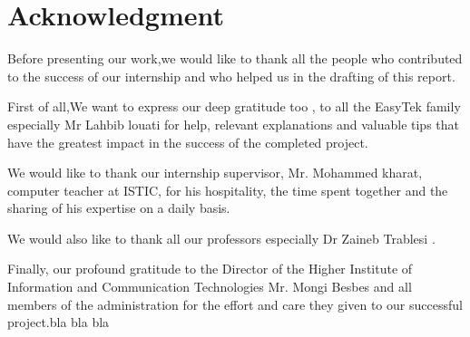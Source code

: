 

\chapter*{Acknowledgment}
Before presenting our work,we would like to thank all the people who contributed to the success of our internship and who helped us in the drafting of this report.

\vspace * {1cm}
First of all,We want to express our deep gratitude too ,  to all the EasyTek family especially Mr Lahbib louati for help, relevant explanations and valuable tips that have the greatest impact in the success of the completed project.

\vspace * {1cm}

We would like to thank our internship supervisor, Mr. Mohammed kharat, computer teacher at ISTIC, for his hospitality, the time spent together and the sharing of his expertise on a daily basis.

\vspace * {1cm}
We would also like to thank all our professors  especially Dr Zaineb Trablesi .

\vspace * {1cm}

Finally, our profound gratitude to the Director of the Higher Institute of Information and Communication Technologies Mr. Mongi Besbes  and all members of the administration for the effort and care they given to our successful project.bla bla bla



